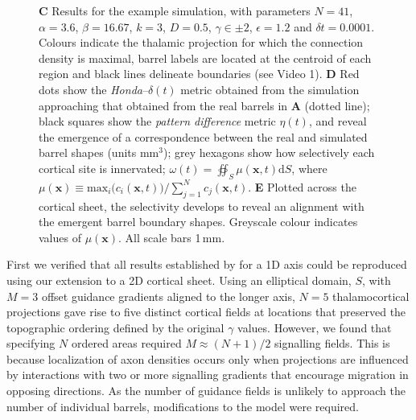 \documentclass[9pt,lineno]{elife}
\newcommand{\cmnt}[1]{\textcolor{colcmnt}{#1}}
\newcommand{\mb}[1]{\mathbf{#1}}
\begin{document}
\begin{figure}
\begin{fullwidth}
{      \textbf{C} Results for the example simulation, with parameters
      \cmnt{$N=41$, $\alpha=3.6$, $\beta=16.67$, $k=3$, $D=0.5$,
        $\gamma\in\pm 2$, $\epsilon=1.2$} and $\delta{t}=0.0001$. Colours
      indicate the thalamic projection for which the connection density is
      maximal, \cmnt{barrel labels are located at the centroid of each
        region and} black lines delineate boundaries (see Video 1).
      \textbf{D} Red dots show the \emph{Honda}--\cmnt{$\delta(t)$} metric
      obtained from \cmnt{the} simulation approaching that obtained from
      the \cmnt{real} barrels in \textbf{A} (dotted line); black squares
      show the \emph{pattern difference} metric $\eta(t)$, and reveal the
      emergence of a correspondence between the real and simulated barrel
      shapes (units mm$^3$); \cmnt{grey hexagons show how selectively each
        cortical site is innervated;
        $\omega(t) = \oiint_{S} \mu(\mb{x},t) \mathrm{d}S$, where
        $\mu(\mb{x}) \equiv \mathrm{max}_i\big(c_i(\mb{x},t)\big)\big/\sum_{j=1}^{N} c_j(\mb{x},t)$.}
      \textbf{E} \cmnt{Plotted across the cortical sheet, the selectivity
        develops to reveal an alignment with the emergent barrel boundary
        shapes}. \cmnt{Greyscale colour indicates values of $\mu(\mb{x})$.}
      All scale bars 1\,mm.}
    \label{fig:main}
  \end{fullwidth}
\end{figure}

First we verified that all results established by \cite{karbowski_model_2004}
for a 1D axis could be reproduced using our extension to a 2D cortical
sheet. Using an elliptical domain, $S$, with $M=3$ offset guidance gradients
aligned to the longer axis, $N=5$ thalamocortical projections gave rise to
five distinct cortical fields at locations that preserved the topographic
ordering defined by the original $\gamma$ values. However, we found that
specifying $N$ ordered areas required $M\approx (N+1)/2$ signalling
fields. This is because localization of axon densities occurs only when
projections are influenced by interactions with two or more signalling
gradients that encourage migration in opposing directions. As the number of
guidance fields is unlikely to approach the number of individual barrels,
\cmnt{modifications to the model} were required.
\end{document}
